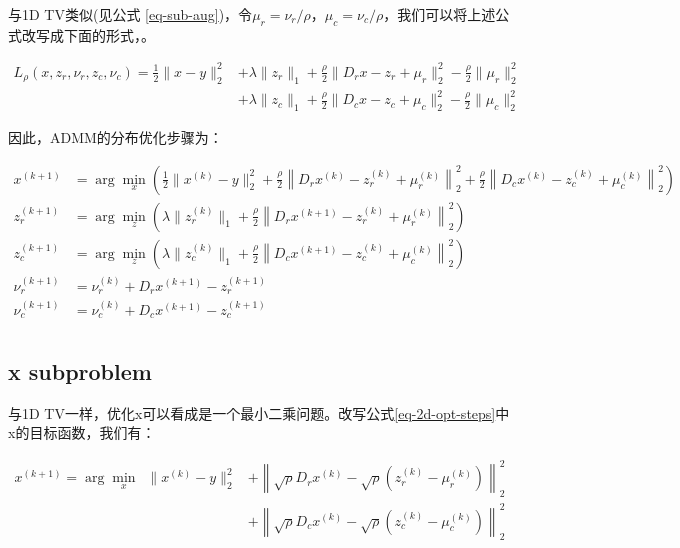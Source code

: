 \documentclass[10pt]{report}
\begin{document}
与1D TV类似(见公式 \ref{eq-sub-aug})，令$\mu_r = \nu_r / \rho$，$\mu_c = \nu_c / \rho$，我们可以将上述公式改写成下面的形式，。

\begin{equation}
\begin{aligned}
L_{\rho}( x , z_r , \nu_r, z_c, \nu_c )= \frac{1}{2}\|x-y\|_{2}^{2} & + \lambda\|z_r\|_{1}+ \frac{\rho}{2}\|D_r x-z_r+ \mu_r \|_{2}^{2}-\frac{\rho}{2}\| \mu_r \|_{2}^{2} \\
& + \lambda\|z_c\|_{1}+ \frac{\rho}{2}\|D_c x-z_c+ \mu_c \|_{2}^{2}-\frac{\rho}{2}\| \mu_c \|_{2}^{2}
\end{aligned}
\end{equation}

因此，ADMM的分布优化步骤为：

\begin{equation}
\begin{aligned}
x ^{(k+1)} &=\arg \min _{ x }\left(\frac{1}{2} \|x^{(k)} - y\|_{2}^{2}+\frac{\rho}{2}\left\| D_r x^{(k)} - z_r ^{(k)}+ \mu_r ^{(k)}\right\|_{2}^{2} +\frac{\rho}{2}\left\| D_c x^{(k)} - z_c ^{(k)}+ \mu_c ^{(k)}\right\|_{2}^{2} \right) \\
z_r ^{(k+1)} &=\arg \min _{ z }\left(\lambda\|z_r^{(k)}\|_{1}+\frac{\rho}{2}\left\| D_r x ^{(k+1)}- z_r^{(k)} + \mu_r ^{(k)}\right\|_{2}^{2}\right) \\
z_c ^{(k+1)} &=\arg \min _{ z }\left(\lambda\|z_c^{(k)}\|_{1}+\frac{\rho}{2}\left\| D_c x ^{(k+1)}- z_c^{(k)} + \mu_c ^{(k)}\right\|_{2}^{2}\right) \\
\nu_r ^{(k+1)} &= \nu_r ^{(k)}+ D_r x ^{(k+1)}- z_r ^{(k+1)} \\
\nu_c ^{(k+1)} &= \nu_c ^{(k)}+ D_c x ^{(k+1)}- z_c ^{(k+1)} \\
\end{aligned}
\label{eq-2d-opt-steps}
\end{equation}

\subsection{x subproblem}

与1D TV一样，优化x可以看成是一个最小二乘问题。改写公式\ref{eq-2d-opt-steps}中x的目标函数，我们有：

\begin{equation}
\begin{aligned}
x ^{(k+1)} =\arg \min _{ x } \enspace \|x^{(k)}-y\|_{2}^{2} & + \left\|\sqrt{\rho}D_r x^{(k)}- \sqrt{\rho}(z_r ^{(k)}- \mu_r ^{(k)})\right\|_{2}^{2} \\
& + \left\|\sqrt{\rho}D_c x^{(k)}- \sqrt{\rho}(z_c ^{(k)}- \mu_c ^{(k)})\right\|_{2}^{2} 
\end{aligned}
\end{equation}
\end{document}
